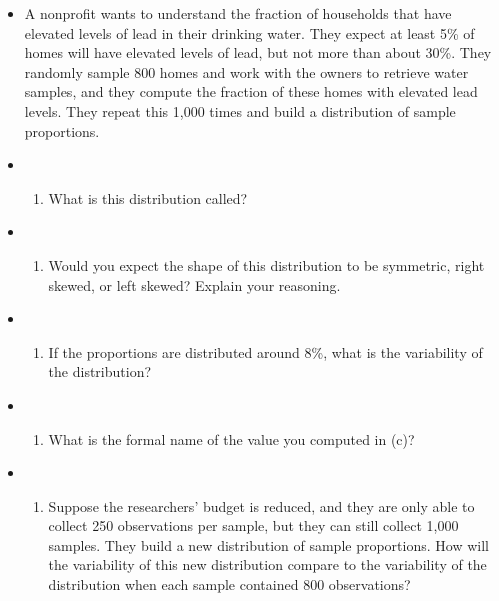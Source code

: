 \documentclass[]{book}
\providecommand{\tightlist}{%
  \setlength{\itemsep}{0pt}\setlength{\parskip}{0pt}}
\begin{document}
\begin{itemize}
\item
  A nonprofit wants to understand the fraction of households that have elevated levels of lead in their drinking water. They expect at least 5\% of homes will have elevated levels of lead, but not more than about 30\%. They randomly sample 800 homes and work with the owners to retrieve water samples, and they compute the fraction of these homes with elevated lead levels. They repeat this 1,000 times and build a distribution of sample proportions.
\item
  \begin{enumerate}
  \def\labelenumi{(\alph{enumi})}
  \tightlist
  \item
    What is this distribution called?
  \end{enumerate}
\item
  \begin{enumerate}
  \def\labelenumi{(\alph{enumi})}
  \setcounter{enumi}{1}
  \tightlist
  \item
    Would you expect the shape of this distribution to be symmetric, right skewed, or left skewed? Explain your reasoning.
  \end{enumerate}
\item
  \begin{enumerate}
  \def\labelenumi{(\alph{enumi})}
  \setcounter{enumi}{2}
  \tightlist
  \item
    If the proportions are distributed around 8\%, what is the variability of the distribution?
  \end{enumerate}
\item
  \begin{enumerate}
  \def\labelenumi{(\alph{enumi})}
  \setcounter{enumi}{3}
  \tightlist
  \item
    What is the formal name of the value you computed in (c)?
  \end{enumerate}
\item
  \begin{enumerate}
  \def\labelenumi{(\alph{enumi})}
  \setcounter{enumi}{4}
  \tightlist
  \item
    Suppose the researchers' budget is reduced, and they are only able to collect 250 observations per sample, but they can still collect 1,000 samples. They build a new distribution of sample proportions. How will the variability of this new distribution compare to the variability of the distribution when each sample contained 800 observations?
  \end{enumerate}
\end{itemize}
\end{document}

